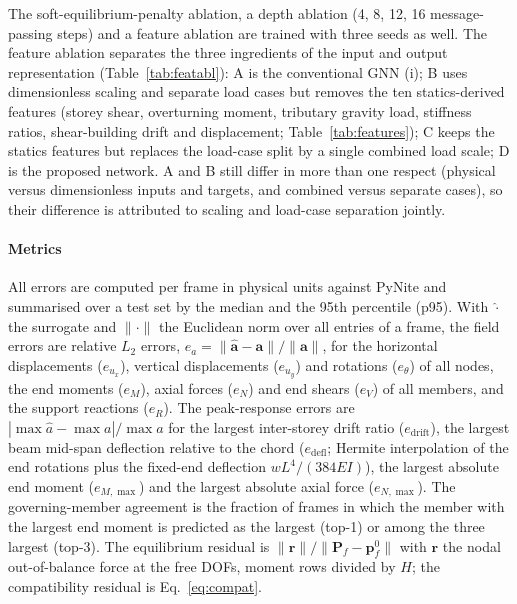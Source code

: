 The soft-equilibrium-penalty ablation, a depth ablation (4, 8, 12, 16 message-passing steps) and a feature ablation are trained with three seeds as well. The feature ablation separates the three ingredients of the input and output representation (Table~\ref{tab:featabl}): A is the conventional GNN (i); B uses dimensionless scaling and separate load cases but removes the ten statics-derived features (storey shear, overturning moment, tributary gravity load, stiffness ratios, shear-building drift and displacement; Table~\ref{tab:features}); C keeps the statics features but replaces the load-case split by a single combined load scale; D is the proposed network. A and B still differ in more than one respect (physical versus dimensionless inputs and targets, and combined versus separate cases), so their difference is attributed to scaling and load-case separation jointly.

\paragraph{Metrics} All errors are computed per frame in physical units against PyNite and summarised over a test set by the median and the 95th percentile (p95). With $\hat{\cdot}$ the surrogate and $\|\cdot\|$ the Euclidean norm over all entries of a frame, the field errors are relative $L_2$ errors, $e_a = \|\hat{\mathbf{a}}-\mathbf{a}\|/\|\mathbf{a}\|$, for the horizontal displacements ($e_{u_x}$), vertical displacements ($e_{u_y}$) and rotations ($e_\theta$) of all nodes, the end moments ($e_M$), axial forces ($e_N$) and end shears ($e_V$) of all members, and the support reactions ($e_R$). The peak-response errors are $|\max\hat a-\max a|/\max a$ for the largest inter-storey drift ratio ($e_\mathrm{drift}$), the largest beam mid-span deflection relative to the chord ($e_\mathrm{defl}$; Hermite interpolation of the end rotations plus the fixed-end deflection $wL^4/(384EI)$), the largest absolute end moment ($e_{M,\max}$) and the largest absolute axial force ($e_{N,\max}$). The governing-member agreement is the fraction of frames in which the member with the largest end moment is predicted as the largest (top-1) or among the three largest (top-3). The equilibrium residual is $\|\mathbf{r}\|/\|\mathbf{P}_f-\mathbf{p}^0_f\|$ with $\mathbf{r}$ the nodal out-of-balance force at the free DOFs, moment rows divided by $H$; the compatibility residual is Eq.~\eqref{eq:compat}.

